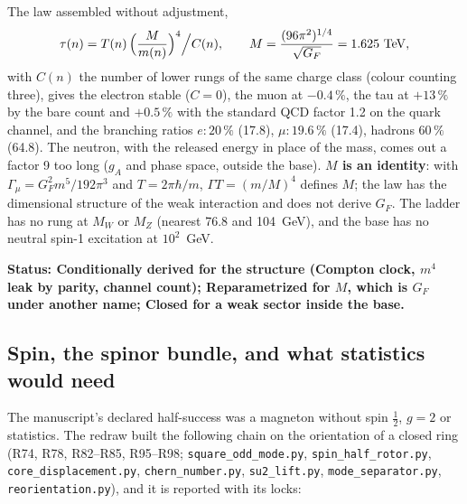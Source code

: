 \documentclass[11pt,a4paper]{article}
\theoremstyle{plain}
\theoremstyle{remark}
\newcommand{\status}[1]{\medskip\noindent\textbf{Status: #1.}\ }
\begin{document}
The law assembled without adjustment,
\[
\tau(n) = T(n)\,\Big(\frac{M}{m(n)}\Big)^4\Big/ C(n),\qquad M = \frac{(96\pi^2)^{1/4}}{\sqrt{G_F}} = 1.625\ {\rm TeV},
\]
with $C(n)$ the number of lower rungs of the same charge class (colour counting three), gives the
electron stable ($C = 0$), the muon at $-0.4\,\%$, the tau at $+13\,\%$ by the bare count and
$+0.5\,\%$ with the standard QCD factor 1.2 on the quark channel, and the branching ratios
$e: 20\,\%$ (17.8), $\mu: 19.6\,\%$ (17.4), hadrons $60\,\%$ (64.8). The neutron, with the released
energy in place of the mass, comes out a factor 9 too long ($g_A$ and phase space, outside the
base). \textbf{$M$ is an identity}: with $\Gamma_\mu = G_F^2 m^5/192\pi^3$ and $T = 2\pi\hbar/m$,
$\Gamma T = (m/M)^4$ defines $M$; the law has the dimensional structure of the weak interaction and
does not derive $G_F$. The ladder has no rung at $M_W$ or $M_Z$ (nearest 76.8 and 104~GeV), and the
base has no neutral spin-1 excitation at $10^2$~GeV.

\status{Conditionally derived for the structure (Compton clock, $m^4$ leak by parity, channel
count); Reparametrized for $M$, which is $G_F$ under another name; Closed for a weak sector
inside the base}

\subsection{Spin, the spinor bundle, and what statistics would need}\label{sec:spin}

The manuscript's declared half-success was a magneton without spin $\tfrac12$, $g = 2$ or
statistics. The redraw built the following chain on the orientation of a closed ring (R74,
R78, R82--R85, R95--R98; \texttt{square\_odd\_mode.py}, \texttt{spin\_half\_rotor.py},
\texttt{core\_displacement.py}, \texttt{chern\_number.py}, \texttt{su2\_lift.py},
\texttt{mode\_separator.py}, \texttt{reorientation.py}), and it is reported with its locks:
\end{document}

